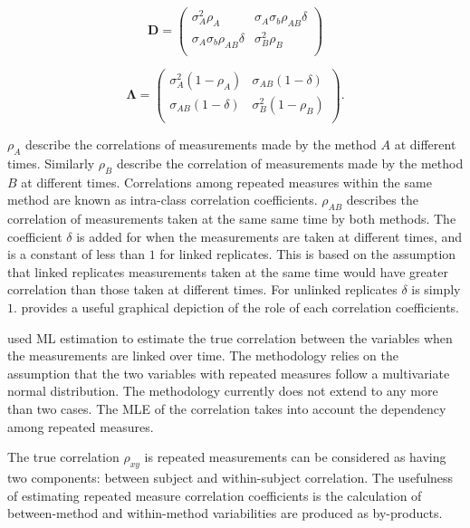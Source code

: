 \documentclass[12pt, a4paper]{report}
\theoremstyle{plain}
\theoremstyle{definition}
\theoremstyle{remark}
\begin{document}
\[
\boldsymbol{D} = \left( \begin{array}{cc}
\sigma^2_{A}\rho_{A} & \sigma_{A}\sigma_{b}\rho_{AB}\delta \\
\sigma_{A}\sigma_{b}\rho_{AB}\delta & \sigma^2_{B}\rho_{B}\\

\end{array}\right)
\]

\[
\boldsymbol{\Lambda} = \left(
\begin{array}{cc}
\sigma^2_{A}(1-\rho_{A}) & \sigma_{AB}(1-\delta)  \\
\sigma_{AB}(1-\delta) & \sigma^2_{B}(1-\rho_{B}) \\
\end{array}\right).
\]

$\rho_{A}$ describe the correlations of measurements made by the method $A$ at different times. Similarly $\rho_{B}$ describe the correlation of measurements made by the method $B$ at different times. Correlations among repeated measures within the same method are known as intra-class correlation coefficients. $\rho_{AB}$ describes the correlation of measurements taken at the same same time by both methods. The coefficient $\delta$ is added for when the measurements are taken at different times, and is a constant of less than $1$ for linked replicates. This is based on the assumption that linked replicates measurements taken at the same time would have greater correlation than those taken at different times. For unlinked replicates $\delta$ is simply $1$. \citet{hamlett} provides a useful graphical depiction of the role of each correlation coefficients.

\citet{Lam} used ML estimation to estimate the true correlation between the variables when the measurements are linked over time. The methodology relies on the assumption that the two variables with repeated measures follow a multivariate normal distribution. The methodology currently does not extend to any more than two cases. The MLE of the correlation takes into account the dependency among repeated measures.

The true correlation $\rho_{xy}$ is repeated measurements can be considered as having two components: between subject and within-subject correlation. The usefulness of estimating repeated measure correlation coefficients is the calculation of between-method and within-method variabilities are produced as by-products.
\end{document}
